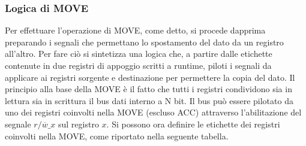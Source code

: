 \subsubsection{Logica di MOVE}
Per effettuare l'operazione di MOVE, come detto, si procede dapprima preparando i segnali che permettano lo spostamento del dato da un registro all'altro. Per fare ciò si sintetizza una logica che, a partire dalle etichette contenute in due registri di appoggio scritti a runtime, piloti i segnali da applicare ai registri sorgente e destinazione per permettere la copia del dato.
Il principio alla base della MOVE è il fatto che tutti i registri condividono sia in lettura sia in scrittura il bus dati interno a N bit. Il bus può essere pilotato da uno dei registri coinvolti nella MOVE (escluso ACC) attraverso l'abilitazione del segnale \textit{$r/\overline{w}\_x$} sul registro $x$. 
Si possono ora definire le etichette dei registri coinvolti nella MOVE, come riportato nella seguente tabella.
